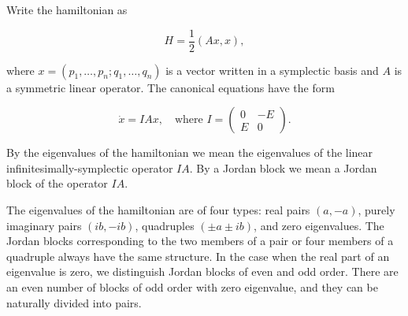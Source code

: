 Write the hamiltonian as

$$H = \frac{1}{2}(Ax, x),$$

where $x = (p_1, \ldots, p_n; q_1, \ldots, q_n)$ is a vector written in a symplectic basis and $A$ is a symmetric linear operator. The canonical equations have the form

$$\dot{x} = IAx, \quad \text{where } I = \begin{pmatrix} 0 & -E \\ E & 0 \end{pmatrix}.$$

By the eigenvalues of the hamiltonian we mean the eigenvalues of the linear infinitesimally-symplectic operator $IA$. By a Jordan block we mean a Jordan block of the operator $IA$.

The eigenvalues of the hamiltonian are of four types: real pairs $(a, -a)$, purely imaginary pairs $(ib, -ib)$, quadruples $(\pm a \pm ib)$, and zero eigenvalues. The Jordan blocks corresponding to the two members of a pair or four members of a quadruple always have the same structure. In the case when the real part of an eigenvalue is zero, we distinguish Jordan blocks of even and odd order. There are an even number of blocks of odd order with zero eigenvalue, and they can be naturally divided into pairs.
